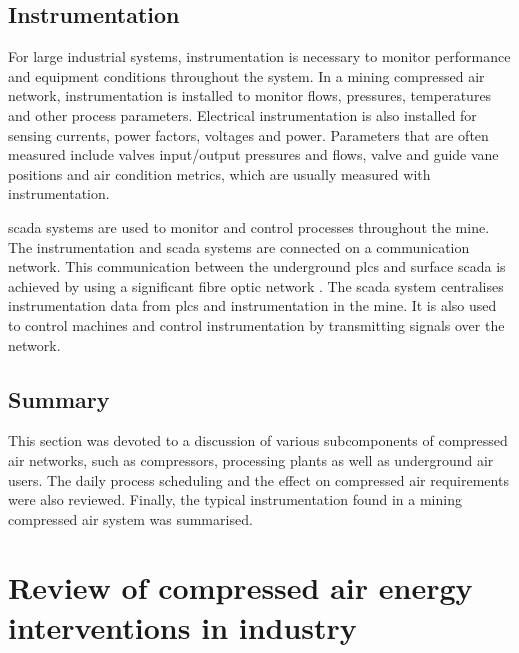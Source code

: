 \subsection{Instrumentation}
For large industrial systems, instrumentation is necessary to monitor performance and equipment conditions throughout the system. In a mining compressed air network, instrumentation is installed to monitor flows, pressures, temperatures and other process parameters. Electrical instrumentation is also installed for sensing currents, power factors, voltages and power. Parameters that are often measured include valves input/output pressures and flows, valve and guide vane positions and air condition metrics, which are usually measured with instrumentation.	
\par
\Gls{scada} systems are used to monitor and control processes throughout the mine. The instrumentation and \gls{scada} systems are connected on a communication network.
This communication between the underground \glspl{plc} and surface \gls{scada} is achieved by using a significant fibre optic network \cite{schroeder2009energy}. The \gls{scada} system centralises instrumentation data from \glspl{plc} and instrumentation in the mine. It is also used to control machines and control instrumentation by transmitting signals over the network. 
\subsection{Summary}
This section was devoted to a discussion of various subcomponents of compressed air networks, such as compressors, processing plants as well as underground air users. The daily process scheduling and the effect on compressed air requirements were also reviewed. Finally, the typical instrumentation found in a mining compressed air system was summarised.
\section{Review of compressed air energy interventions in industry}

